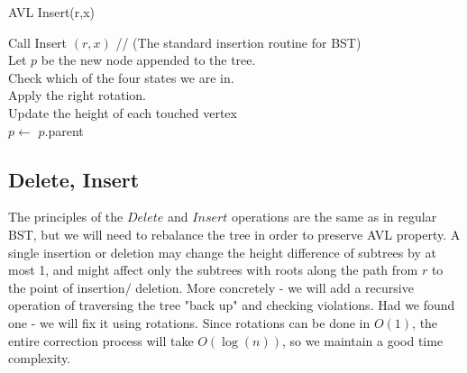 \begin{algbox}{AVL Insert(r,x)}
  \begin{algorithm}[H]
    Call Insert $(r,x)$ // (The standard insertion routine for BST) \\  
    Let $p$ be the new node appended to the tree. \\
     {
      Check which of the four states we are in.\\ 
      Apply the right rotation. \\ 
      Update the height of each touched vertex  \\
      $p \leftarrow$ $p$.parent \\  
    }
  \end{algorithm}
\end{algbox}


\iffalse
\newpage
\subsection{Delete, Insert}
The principles of the $Delete$ and $Insert$ operations are the same as in
regular BST, but we will need to rebalance the tree in order to preserve AVL
property.
A single insertion or deletion may change the height difference of subtrees
by at most 1, and might affect only the subtrees with roots along the path
from $r$ to the point of insertion/ deletion.
More concretely - we will add a recursive operation of traversing the tree
"back up" and checking violations. Had we found one - we will fix it using
rotations. Since rotations can be done in $O(1)$, the entire correction
process will take $O(\log(n))$, so we maintain a good time complexity.
